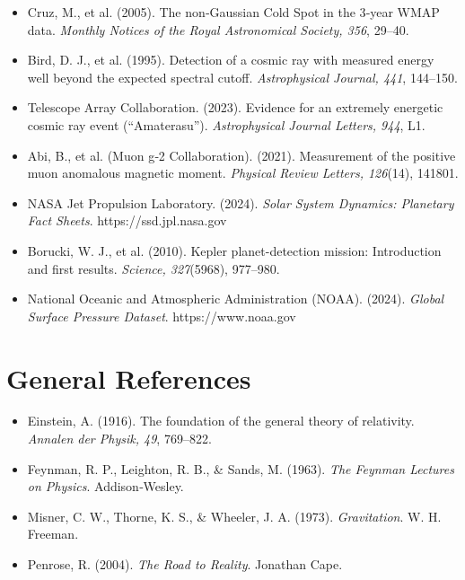 \documentclass[11pt, letterpaper, openany]{book}
\begin{document}
\begin{itemize}
    \item Cruz, M., et al. (2005). The non‑Gaussian Cold Spot in the 3‑year WMAP data. \textit{Monthly Notices of the Royal Astronomical Society, 356}, 29–40.

    \item Bird, D. J., et al. (1995). Detection of a cosmic ray with measured energy well beyond the expected spectral cutoff. \textit{Astrophysical Journal, 441}, 144–150.

    \item Telescope Array Collaboration. (2023). Evidence for an extremely energetic cosmic ray event (“Amaterasu”). \textit{Astrophysical Journal Letters, 944}, L1.

    \item Abi, B., et al. (Muon g‑2 Collaboration). (2021). Measurement of the positive muon anomalous magnetic moment. \textit{Physical Review Letters, 126}(14), 141801.

    \item NASA Jet Propulsion Laboratory. (2024). \textit{Solar System Dynamics: Planetary Fact Sheets}. https://ssd.jpl.nasa.gov

    \item Borucki, W. J., et al. (2010). Kepler planet-detection mission: Introduction and first results. \textit{Science, 327}(5968), 977–980.

    \item National Oceanic and Atmospheric Administration (NOAA). (2024). \textit{Global Surface Pressure Dataset}. https://www.noaa.gov

\end{itemize}


\section*{General References}

\begin{itemize}
    \item Einstein, A. (1916). The foundation of the general theory of relativity. \textit{Annalen der Physik, 49}, 769–822.

    \item Feynman, R. P., Leighton, R. B., \& Sands, M. (1963). \textit{The Feynman Lectures on Physics}. Addison‑Wesley.

    \item Misner, C. W., Thorne, K. S., \& Wheeler, J. A. (1973). \textit{Gravitation}. W. H. Freeman.

    \item Penrose, R. (2004). \textit{The Road to Reality}. Jonathan Cape.
\end{itemize}
\end{document}
